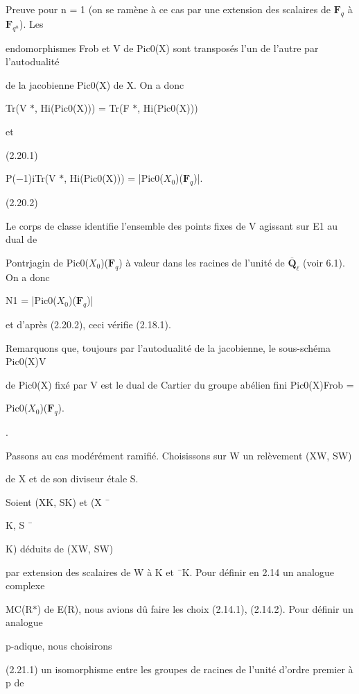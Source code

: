 \documentclass[11pt]{article}
\begin{document}
\noindent Preuve pour n = 1 (on se ramène à ce cas par une extension des scalaires de \(\mathbf F_q\) à \(\mathbf F_{q^n}\)). Les\par
\noindent endomorphismes Frob et V de Pic0(X) sont transposés l’un de l’autre par l’autodualité\par
\noindent de la jacobienne Pic0(X) de X. On a donc\par
\noindent Tr(V \(*\), Hi(Pic0(X))) = Tr(F \(*\), Hi(Pic0(X)))\par
\noindent et\par
\noindent (2.20.1)\par
\noindent P(−1)iTr(V \(*\), Hi(Pic0(X))) = |Pic0(\(X_0\))(\(\mathbf F_q\))|.\par
\noindent (2.20.2)\par
\medskip
\noindent Le corps de classe identifie l’ensemble des points fixes de V agissant sur E1 au dual de\par
\noindent Pontrjagin de Pic0(\(X_0\))(\(\mathbf F_q\)) à valeur dans les racines de l’unité de \(\overline{\mathbf Q}_{\ell}\) (voir 6.1). On a donc\par
\noindent N1 = |Pic0(\(X_0\))(\(\mathbf F_q\))|\par
\noindent et d’après (2.20.2), ceci vérifie (2.18.1).\par
\noindent Remarquons que, toujours par l’autodualité de la jacobienne, le sous-schéma Pic0(X)V\par
\noindent de Pic0(X) fixé par V est le dual de Cartier du groupe abélien fini Pic0(X)Frob =\par
\noindent Pic0(\(X_0\))(\(\mathbf F_q\)).\par
{}.\par
\noindent Passons au cas modérément ramifié. Choisissons sur W un relèvement (XW, SW)\par
\noindent de X et de son diviseur étale S.\par
\noindent Soient (XK, SK) et (X ¯\par
\noindent K, S ¯\par
\noindent K) déduits de (XW, SW)\par
\noindent par extension des scalaires de W à K et ¯K. Pour définir en 2.14 un analogue complexe\par
\noindent MC(R\(*\)) de E(R), nous avions dû faire les choix (2.14.1), (2.14.2). Pour définir un analogue\par
\noindent p-adique, nous choisirons\par
\noindent (2.21.1) un isomorphisme entre les groupes de racines de l’unité d’ordre premier à p de\par
\end{document}
